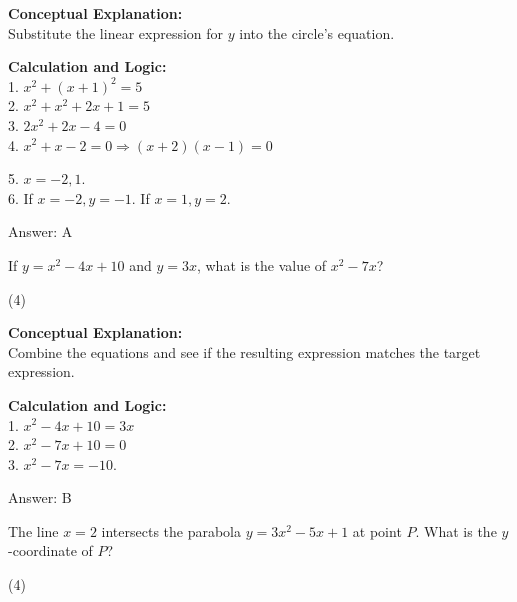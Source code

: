 \documentclass[11pt,paper=a4,answers]{exam}
\begin{document}
\begin{questions}
\begin{solution}
\textbf{Conceptual Explanation:} \\
Substitute the linear expression for $y$ into the circle's equation.

\vspace{20pt}

\textbf{Calculation and Logic:} \\
1. $x^2 + (x + 1)^2 = 5$ \\
2. $x^2 + x^2 + 2x + 1 = 5$ \\
3. $2x^2 + 2x - 4 = 0$ \\
4. $x^2 + x - 2 = 0 \Rightarrow (x + 2)(x - 1) = 0$

\vspace{10pt}

5. $x = -2, 1$. \\
6. If $x = -2, y = -1$. If $x = 1, y = 2$.

\vspace{25pt}

Answer: \colorbox{yellow!100}{A}
\end{solution}

\vspace{40pt}

\question
If $y = x^2 - 4x + 10$ and $y = 3x$, what is the value of $x^2 - 7x$?
\begin{tasks}(4)
\end{tasks}

\begin{solution}
\textbf{Conceptual Explanation:} \\
Combine the equations and see if the resulting expression matches the target expression.

\vspace{20pt}

\textbf{Calculation and Logic:} \\
1. $x^2 - 4x + 10 = 3x$ \\
2. $x^2 - 7x + 10 = 0$ \\
3. $x^2 - 7x = -10$.

\vspace{25pt}

Answer: \colorbox{yellow!100}{B}
\end{solution}

\vspace{40pt}

\question
The line $x = 2$ intersects the parabola $y = 3x^2 - 5x + 1$ at point $P$. What is the $y$-coordinate of $P$?
\begin{tasks}(4)
\end{tasks}


\end{questions}
\end{document}
